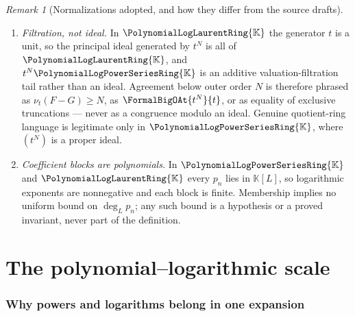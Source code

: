 \documentclass[11pt,oneside]{article}
\theoremstyle{plain}
\theoremstyle{definition}
\theoremstyle{remark}
\newtheorem{remark}[theorem]{Remark}
\newcommand{\K}{\mathbb{K}}
\newcommand{\PLpow}{\PolynomialLogPowerSeriesRing{\K}}   %
\newcommand{\PLlau}{\PolynomialLogLaurentRing{\K}}       %
\newcommand{\ordt}{\nu_{t}}                              %
\begin{document}
\begin{remark}[Normalizations adopted, and how they differ from the source
drafts]
\begin{enumerate}
  ambiguous notation \(F^{-1}\) is used for neither.
\item \emph{Filtration, not ideal.}  In \(\PLlau\) the generator \(t\) is a
  unit, so the principal ideal generated by \(t^{N}\) is all of \(\PLlau\), and
  \(t^{N}\PLpow\) is an additive valuation-filtration tail rather than an
  ideal.  Agreement below outer order \(N\) is therefore phrased as
  \(\ordt(F-G)\ge N\), as \(\FormalBigOAt{t^{N}}{t}\), or as equality of
  exclusive truncations --- never as a congruence modulo an ideal.  Genuine
  quotient-ring language is legitimate only in \(\PLpow\), where \((t^{N})\) is
  a proper ideal.
\item \emph{Coefficient blocks are polynomials.}  In \(\PLpow\) and
  \(\PLlau\) every \(p_{n}\) lies in \(\K[L]\), so logarithmic exponents are
  nonnegative and each block is finite.  Membership implies no uniform bound on
  \(\deg_{L}p_{n}\); any such bound is a hypothesis or a proved invariant, never
  part of the definition.
\end{enumerate}
\end{remark}

\clearpage
\part{The polynomial--logarithmic scale}


\section{Why powers and logarithms belong in one expansion}
\label{plt:sec:motivation}
\end{document}

